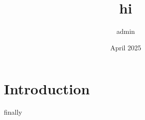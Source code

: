 \documentclass{article}
\title{hi}
\author{admin }
\date{April 2025}
\begin{document}
\maketitle

\section{Introduction}

finally
\end{document}
